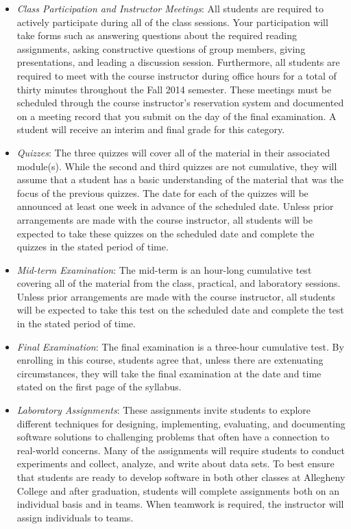 \begin{itemize}

  \item {\em Class Participation and Instructor Meetings}: All students are required to actively participate
    during all of the class sessions. Your participation will take forms such as answering questions about the
    required reading assignments, asking constructive questions of group members, giving presentations, and
    leading a discussion session. Furthermore, all students are required to meet with the course instructor during
    office hours for a total of thirty minutes throughout the Fall 2014 semester.  These meetings must be scheduled
    through the course instructor's reservation system and documented on a meeting record that you submit on the
    day of the final examination. A student will receive an interim and final grade for this category.

  \item {\em Quizzes}: The three quizzes will cover all of the material in their associated module(s).  While the second
    and third quizzes are not cumulative, they will assume that a student has a basic understanding of the material that
    was the focus of the previous quizzes.  The date for each of the quizzes will be announced at least one week in
    advance of the scheduled date.  Unless prior arrangements are made with the course instructor, all students will be
    expected to take these quizzes on the scheduled date and complete the quizzes in the stated period of time.

  \item {\em Mid-term Examination}: The mid-term is an hour-long cumulative test covering all of the material from the
    class, practical, and laboratory sessions. Unless prior arrangements are made with the course instructor, all
    students will be expected to take this test on the scheduled date and complete the test in the stated period of
    time.

  \item {\em Final Examination}: The final examination is a three-hour cumulative test.  By enrolling in this
    course, students agree that, unless there are extenuating circumstances, they will take the final examination
    at the date and time stated on the first page of the syllabus.

  \item {\em Laboratory Assignments}: These assignments invite students to explore different techniques for designing,
    implementing, evaluating, and documenting software solutions to challenging problems that often have a connection to
    real-world concerns.  Many of the assignments will require students to conduct experiments and collect, analyze, and
    write about data sets.  To best ensure that students are ready to develop software in both other classes at
    Allegheny College and after graduation, students will complete assignments both on an individual basis and in teams.
    When teamwork is required, the instructor will assign individuals to teams.


\end{itemize}
